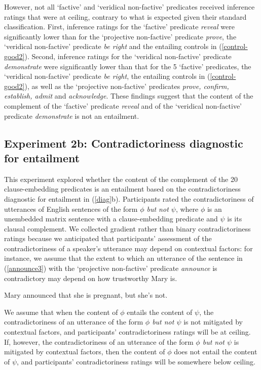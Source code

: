\documentclass[11pt,fleqn]{article}
\newcommand{\6}{\mbox{$[\hspace*{-.6mm}[$}}
\newcommand{\9}{\mbox{$]\hspace*{-.6mm}]$}}
\begin{document}
However, not all `factive' and `veridical non-factive' predicates received inference ratings that were at ceiling, contrary to what is expected given their standard classification. First, inference ratings for the `factive' predicate {\em reveal} were significantly lower than for the `projective non-factive' predicate {\em prove}, the `veridical non-factive' predicate {\em be right} and the entailing controls in (\ref{control-good2}). Second, inference ratings for the `veridical non-factive' predicate {\em demonstrate} were significantly lower than that for the 5 `factive' predicates, the `veridical non-factive' predicate {\em be right}, the entailing controls in (\ref{control-good2}), as well as the `projective non-factive' predicates {\em prove, confirm, establish, admit} and {\em acknowledge}. These findings suggest that the content of the complement of the `factive' predicate {\em reveal} and of the `veridical non-factive' predicate {\em demonstrate} is not an entailment.

\subsection{Experiment 2b: Contradictoriness diagnostic for entailment}\label{s32}

This experiment explored whether the content of the complement of the 20 clause-embedding predicates is an entailment based on the contradictoriness diagnostic for entailment in (\ref{diag}b). Participants rated the contradictoriness of utterances of English sentences of the form {\em $\phi$ but not $\psi$}, where $\phi$ is an unembedded matrix sentence with a clause-embedding predicate and $\psi$ is its clausal complement. We collected gradient rather than binary contradictoriness ratings because we anticipated that participants' assessment of the contradictoriness of a speaker's utterance may depend on contextual factors: for instance, we assume that the extent to which  an utterance of the sentence in (\ref{announce3}) with the `projective non-factive' predicate {\em announce} is contradictory may depend on how trustworthy Mary is. 

\begin{exe}
\ex\label{announce3} Mary announced that she is pregnant, but she's not.
\end{exe}
We assume that when the content of $\phi$ entails the content of $\psi$, the contradictoriness of an utterance of the form {\em $\phi$ but not $\psi$} is not mitigated by contextual factors, and participants' contradictoriness ratings will be at ceiling. If, however, the contradictoriness of an utterance of the form {\em $\phi$ but not $\psi$} is mitigated by contextual factors, then the content of $\phi$ does not entail the content of $\psi$, and participants' contradictoriness ratings will be somewhere below ceiling.
\end{document}
